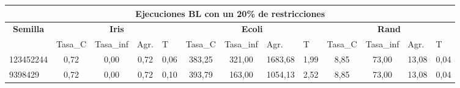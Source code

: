 \documentclass[12pt, spanish]{article}
\begin{document}
\begin{table}[H]

\small

\begin{adjustwidth}{-1cm}{-1cm}%


\begin{tabular}{|l|c|c|c|c|c|c|c|c|c|c|c|c|}
\hline
\multicolumn{13}{|c|}{\textbf{Ejecuciones BL con un 20\% de restricciones}}                                                                                                                                                                                                                                                                                                                                            \\ \hline
\multicolumn{1}{|c|}{\multirow{2}{*}{\textbf{Semilla}}} & \multicolumn{4}{c|}{\textbf{Iris}}                                                                                 & \multicolumn{4}{c|}{\textbf{Ecoli}}                                                                                & \multicolumn{4}{c|}{\textbf{Rand}}                                                                                 \\ \cline{2-13} 
\multicolumn{1}{|c|}{}                                  & \multicolumn{1}{l|}{Tasa\_C} & \multicolumn{1}{l|}{Tasa\_inf} & \multicolumn{1}{l|}{Agr.} & \multicolumn{1}{l|}{T} & \multicolumn{1}{l|}{Tasa\_C} & \multicolumn{1}{l|}{Tasa\_inf} & \multicolumn{1}{l|}{Agr.} & \multicolumn{1}{l|}{T} & \multicolumn{1}{l|}{Tasa\_C} & \multicolumn{1}{l|}{Tasa\_inf} & \multicolumn{1}{l|}{Agr.} & \multicolumn{1}{l|}{T} \\ \hline
123452244                                               & 0,72                         & 0,00                           & 0,72                      & 0,06                   & 383,25                       & 321,00                         & 1683,68                   & 1,99                   & 8,85                         & 73,00                          & 13,08                     & 0,04                   \\ \hline
9398429                                                 & 0,72                         & 0,00                           & 0,72                      & 0,10                   & 393,79                       & 163,00                         & 1054,13                   & 2,52                   & 8,85                         & 73,00                          & 13,08                     & 0,04                   \\ \hline

\end{tabular}
\end{adjustwidth}
\end{table}
\end{document}
